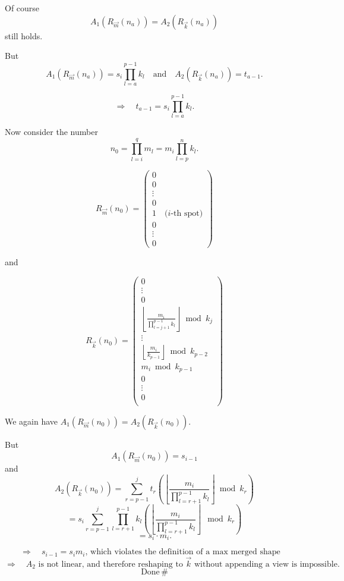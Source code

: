 \documentclass{article}
\begin{document}
Of course
\[
A_1 \left( R_{\vec{m}}(n_a) \right) = A_2 \left( R_{\vec{k}}(n_a) \right)
\]
still holds.

But 
\[
A_1 \left( R_{\vec{m}}(n_a) \right) = s_i \prod_{l=a}^{p-1} k_l \quad \text{and} \quad A_2 \left( R_{\vec{k}}(n_a) \right) = t_{a-1}.
\]

\[
\Rightarrow \quad t_{a-1} = s_i \prod_{l=a}^{p-1} k_l.
\]

Now consider the number
\[
n_0 = \prod_{l=i}^{q} m_l = m_i \prod_{l=p}^{n} k_l.
\]

\[
R_{\vec{m}}(n_0) = 
\begin{pmatrix}
0 \\
0 \\
\vdots \\
0 \\
1 \quad \text{($i$-th spot)} \\
0 \\
\vdots \\
0
\end{pmatrix}
\]

and

\[
R_{\vec{k}}(n_0) = 
\begin{pmatrix}
0 \\
\vdots \\
0 \\
 \left\lfloor \frac{m_i}{\prod_{l=j+1}^{p-1} k_l} \right\rfloor \bmod k_j \\
 \vdots \\
 \left\lfloor \frac{m_i}{k_{p-1}} \right\rfloor \bmod k_{p-2} \\
m_i \bmod k_{p-1} \\
0 \\
\vdots \\
0 \\
\end{pmatrix}
\]

We again have $A_1 \left( R_{\vec{m}}(n_0) \right) = A_2 \left( R_{\vec{k}}(n_0) \right)$.

But
\[
A_1 \left( R_{\vec{m}}(n_0) \right) = s_{i-1}
\]
and
\[
A_2 \left( R_{\vec{k}}(n_0) \right) = \sum_{r=p-1}^{j} t_r \left( \left\lfloor \frac{m_i}{\prod_{l=r+1}^{p-1} k_l} \right\rfloor \bmod k_r \right) 
\]
\[
= s_i\sum_{r=p-1}^{j} \prod_{l=r+1}^{p-1} k_l \left(  \left\lfloor \frac{m_i}{\prod_{l=r+1}^{p-1} k_l} \right\rfloor \mod k_r \right)
\]
\[
= s_i\cdot m_i.
\]

\[
\Rightarrow \quad s_{i-1} = s_i m_i \text{, which violates the definition of a max merged shape}\quad
\]
\[
\Rightarrow \quad A_2 \text{ is not linear, and therefore reshaping to } \vec{k} \text{ without appending a view is impossible.} \quad  
\]
\[
\text{Done} \, \#
\]
\end{document}
